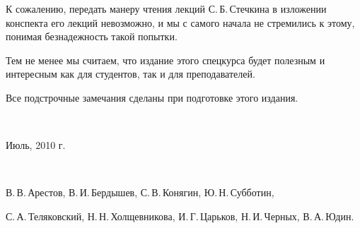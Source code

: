 К сожалению, передать манеру чтения лекций С.\,Б.\,Стечкина
в изложении конспекта его лекций невозможно, и мы с самого
начала не стремились к этому, понимая безнадежность такой
попытки.

Тем не менее мы считаем, что издание этого спецкурса будет
полезным и интересным как для студентов, так и для
преподавателей.

Все подстрочные замечания сделаны при подготовке этого
издания.

\ \

Июль, 2010 г.

\ \

В.\,В.\,Арестов, В.\,И.\,Бердышев, С.\,В.\,Конягин,
Ю.\,Н.\,Субботин,

 С.\,А.\,Теляковский, Н.\,Н.\,Холщевникова, И.\,Г.\,Царьков,
Н.\,И.\,Черных, В.\,А.\,Юдин.
